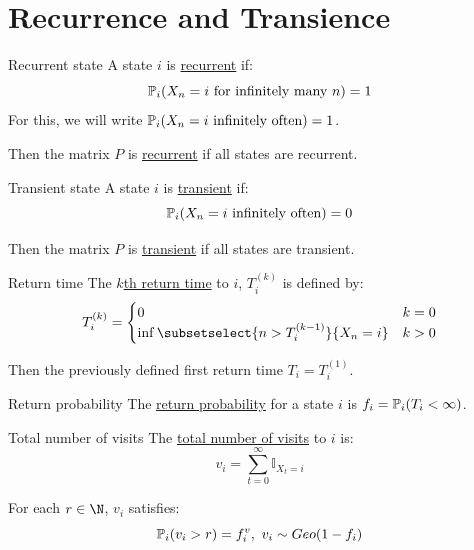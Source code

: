 \documentclass[../Main.tex]{subfiles}
\begin{document}
\section{Recurrence and Transience}
\begin{definition}{Recurrent state}
    A state $i$ is \underline{recurrent} if:
    \begin{equation*}
        \P_i(X_n = i \text{ for infinitely many }n) = 1
    \end{equation*}
    For this, we will write $\P_i(X_n = i \io) = 1$.
\end{definition}
Then the matrix $P$ is \underline{recurrent} if all states are recurrent.
\begin{definition}{Transient state}
    A state $i$ is \underline{transient} if:
    \begin{equation*}
        \P_i(X_n = i \io) = 0
    \end{equation*}
\end{definition}
Then the matrix $P$ is \underline{transient} if all states are transient.
\begin{definition}{Return time}
    The \underline{$k$th return time} to $i$, $T_i^{(k)}$ is defined by:
    \begin{equation*}
        T_i^{(k)} =
        \begin{cases}
            0 & k=0 \\
            \inf\subsetselect{n>T_i^{(k-1)}}{X_n = i} & k > 0
        \end{cases}
    \end{equation*}
\end{definition}
Then the previously defined first return time $T_i = T_i^{(1)}$.
\begin{definition}{Return probability}
    The \underline{return probability} for a state $i$ is $f_i = \P_i(T_i < \infty)$.
\end{definition}
\begin{definition}{Total number of visits}
    The \underline{total number of visits} to $i$ is:
    \begin{equation*}
        v_i = \sum_{t = 0}^\infty \mathbb{I}_{X_t = i}
    \end{equation*}
\end{definition}
\begin{lemma}
    For each $r \in \N$, $v_i$ satisfies:
    \begin{equation*}
        \P_i(v_i > r) = f_i^v,~v_i \sim Geo(1-f_i)
    \end{equation*}
    \label{lemReturnGeometric}
\end{lemma}
\end{document}
